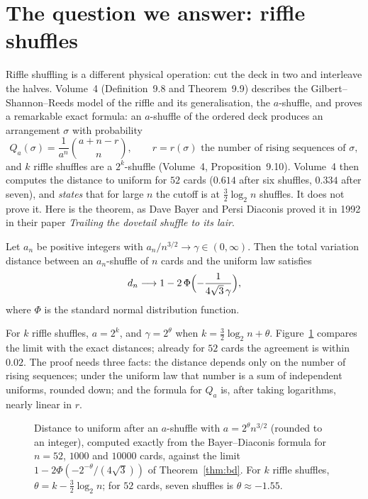 \section{The question we answer: riffle shuffles}

Riffle shuffling is a different physical operation: cut the deck in two and interleave the halves. Volume~4 (Definition~9.8 and
Theorem~9.9) describes the Gilbert--Shannon--Reeds model of the riffle and its generalisation, the $a$-shuffle, and proves a
remarkable exact formula: an $a$-shuffle of the ordered deck produces an arrangement $\sigma$ with probability
\[
Q_a(\sigma)=\frac1{a^n}\binom{a+n-r}n,\qquad r=r(\sigma)\text{ the number of rising sequences of }\sigma,
\]
and $k$ riffle shuffles are a $2^k$-shuffle (Volume~4, Proposition~9.10). Volume~4 then computes the distance to uniform for $52$ cards ($0.614$ after six
shuffles, $0.334$ after seven), and \emph{states} that for large $n$ the cutoff is at $\frac32\log_2n$ shuffles. It does not prove it. Here is the
theorem, as Dave Bayer and Persi Diaconis proved it in 1992 in their paper \emph{Trailing the dovetail shuffle
to its lair}.

\begin{theorem}\label{thm:bd}
Let $a_n$ be positive integers with $a_n/n^{3/2}\to\gamma\in(0,\infty)$. Then the total variation distance between an $a_n$-shuffle of $n$ cards and the
uniform law satisfies
\[
d_n\longrightarrow1-2\,\Phi\Bigl(-\frac1{4\sqrt3\,\gamma}\Bigr),
\]
where $\Phi$ is the standard normal distribution function.
\end{theorem}

For $k$ riffle shuffles, $a=2^k$, and $\gamma=2^\theta$ when $k=\frac32\log_2n+\theta$. Figure~\ref{fig:riffle15} compares the limit with the exact distances; already for $52$
cards the agreement is within $0.02$. The proof needs three facts: the distance depends only on the number of rising sequences; under the
uniform law that number is a sum of independent uniforms, rounded down; and the formula for $Q_a$ is, after taking logarithms, nearly linear in $r$.

\begin{figure}[ht]
\centering
{}
\caption{Distance to uniform after an $a$-shuffle with $a=2^\theta n^{3/2}$ (rounded to an integer), computed exactly from the Bayer--Diaconis formula for $n=52$,
$1000$ and $10000$ cards, against the limit $1-2\Phi(-2^{-\theta}/(4\sqrt3))$ of Theorem~\ref{thm:bd}. For $k$ riffle shuffles, $\theta=k-\frac32\log_2n$; for $52$ cards,
seven shuffles is $\theta\approx-1.55$.}
\label{fig:riffle15}
\end{figure}

